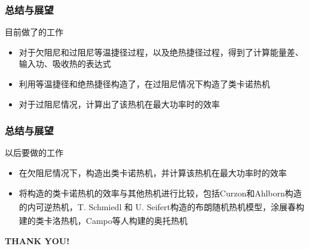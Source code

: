 \documentclass{beamer}
\newcommand{\upcite}[1]{\textsuperscript{\cite{#1}}}  %
\begin{document}
\begin{frame}
    \frametitle{总结与展望}
\begin{alertblock}{目前做了的工作}
\begin{itemize}
    \item<2-> 对于欠阻尼和过阻尼等温捷径过程，以及绝热捷径过程，得到了计算能量差、输入功、吸收热的表达式
    \item<3-> 利用等温捷径和绝热捷径构造了，在过阻尼情况下构造了类卡诺热机
    \item<4-> 对于过阻尼情况，计算出了该热机在最大功率时的效率 
\end{itemize}
\end{alertblock}
\end{frame}

\begin{frame}
    \frametitle{总结与展望}
\begin{alertblock}{以后要做的工作}
\begin{itemize}
    \item<2-> 在欠阻尼情况下，构造出类卡诺热机，并计算该热机在最大功率时的效率
    \item<3-> 将构造的类卡诺热机的效率与其他热机进行比较，包括Curzon和Ahlborn构造的内可逆热机\upcite{Curzon1975}，T. Schmiedl 和 U. Seifert构造的布朗随机热机模型\upcite{Schmiedl2008}，涂展春构建的类卡洛热机\upcite{Tu2013}，Campo等人构建的奥托热机\upcite{DelCampo2014}
\end{itemize}
\end{alertblock}
\end{frame}

\begin{frame}
\begin{center} 
   \LARGE \textbf{THANK YOU!}
\end{center}
\end{frame}


\footnotesize

   
\end{document}
